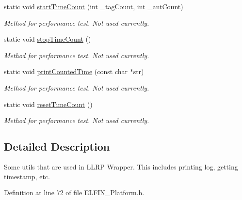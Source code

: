 {\bf }\par
\begin{DoxyCompactItemize}
\item 
static void \hyperlink{class_e_l_f_i_n_1_1_utils_ad17bd0c0b252b5a64971eafbc2ac46bf}{start\-Time\-Count} (int \-\_\-tag\-Count, int \-\_\-ant\-Count)
\begin{DoxyCompactList}\small\item\em Method for performance test. Not used currently. \end{DoxyCompactList}\item 
static void \hyperlink{class_e_l_f_i_n_1_1_utils_a4328e115848a4bfdff5729f59117ec88}{stop\-Time\-Count} ()
\begin{DoxyCompactList}\small\item\em Method for performance test. Not used currently. \end{DoxyCompactList}\item 
static void \hyperlink{class_e_l_f_i_n_1_1_utils_a36dee2569716bb7f97a0cf711e30c944}{print\-Counted\-Time} (const char $\ast$str)
\begin{DoxyCompactList}\small\item\em Method for performance test. Not used currently. \end{DoxyCompactList}\item 
static void \hyperlink{class_e_l_f_i_n_1_1_utils_a2478876ec5a200826a72645e45a523ae}{reset\-Time\-Count} ()
\begin{DoxyCompactList}\small\item\em Method for performance test. Not used currently. \end{DoxyCompactList}\end{DoxyCompactItemize}



\subsection{Detailed Description}
Some utils that are used in L\-L\-R\-P Wrapper. This includes printing log, getting timestamp, etc. 

Definition at line 72 of file E\-L\-F\-I\-N\-\_\-\-Platform.\-h.



